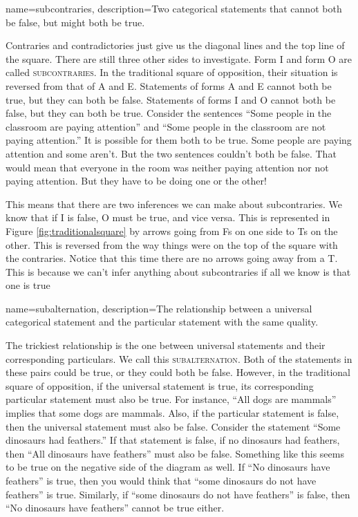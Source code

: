 {
name=subcontraries,
description={Two categorical statements that cannot both be false, but might both be true.}
}

Contraries and contradictories just give us the diagonal lines and the top line of the square. There are still three other sides to investigate. Form I and form O are called \textsc{\gls{subcontraries}}. \label{defSubcontraries} In the traditional square of opposition, their situation is reversed from that of A and E. Statements of forms A and E cannot both be true, but they can both be false. Statements of forms I and O cannot both be false, but they can both be true. Consider the sentences ``Some people in the classroom are paying attention'' and ``Some people in the classroom are not paying attention.'' It is possible for them both to be true. Some people are paying attention and some aren't. But the two sentences couldn't both be false. That would mean that everyone in the room was neither paying attention nor not paying attention. But they have to be doing one or the other!

This means that there are two inferences we can make about subcontraries. We know that if I is false, O must be true, and vice versa. This is represented in Figure \ref{fig:traditionalsquare} by arrows going from Fs on one side to Ts on the other. This is reversed from the way things were on the top of the square with the contraries. Notice that this time there are no arrows going away from a T. This is because we can't infer anything about subcontraries if all we know is that one is true

{
name=subalternation,
description={The relationship between a universal categorical statement and the particular statement with the same quality.}
}


The trickiest relationship is the one between universal statements and their corresponding particulars. We call this \textsc{\gls{subalternation}}. Both of the statements in these pairs could be true, or they could both be false. However, in the traditional square of opposition, if the universal statement is true, its corresponding particular statement must also be true. For instance, ``All dogs are mammals'' implies that some dogs are mammals. Also, if the particular statement is false, then the universal statement must also be false. Consider the statement ``Some dinosaurs had feathers.'' If that statement is false, if no dinosaurs had feathers, then ``All dinosaurs have feathers'' must also be false. Something like this seems to be true on the negative side of the diagram as well. If ``No dinosaurs have feathers'' is true, then you would think that ``some dinosaurs do not have feathers'' is true. Similarly, if ``some dinosaurs do not have feathers'' is false, then ``No dinosaurs have feathers'' cannot be true either.

